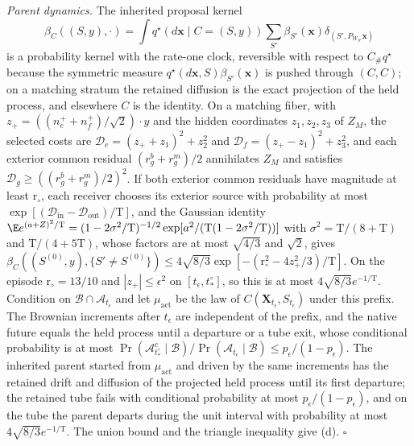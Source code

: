 \emph{Parent dynamics.} The inherited proposal kernel
\[
\beta_C((S,y),\cdot)=\int q^\star(d\mathbf x\mid C=(S,y))\sum_{S'}\beta_{S'}(\mathbf x)
\delta_{(S',P_{W_{S'}}\mathbf x)}
\]
is a probability kernel with the rate-one clock, reversible with respect to
\(C_\#q^\star\) because the symmetric measure
\(q^\star(d\mathbf x,S)\beta_{S'}(\mathbf x)\) is pushed through \((C,C)\); on a
matching stratum the retained diffusion is the exact projection of the held
process, and elsewhere \(C\) is the identity. On a matching fiber, with
\(z_+=((n^+_e+n^+_f)/\sqrt2)\cdot y\) and the hidden coordinates
\(z_1,z_2,z_3\) of \(Z_M\), the selected costs are
\(\mathcal D_e=(z_++z_1)^2+z_2^2\) and \(\mathcal D_f=(z_+-z_1)^2+z_3^2\), and each
exterior common residual \((r^b_g+r^m_g)/2\) annihilates \(Z_M\) and satisfies
\(\mathcal D_g\ge((r^b_g+r^m_g)/2)^2\). If both exterior common residuals have
magnitude at least \(\mathrm r_\circ\), each receiver chooses its exterior
source with probability at most
\(\exp[(\mathcal D_{\mathrm{in}}-\mathcal D_{\mathrm{out}})/\mathrm T]\), and the
Gaussian identity
\(\E e^{(a+Z)^2/\mathrm T}=(1-2\sigma^2/\mathrm T)^{-1/2}\exp[a^2/(\mathrm T(1-2\sigma^2/\mathrm T))]\)
with \(\sigma^2=\mathrm T/(8+\mathrm T)\) and \(\mathrm T/(4+5\mathrm T)\), whose
factors are at most \(\sqrt{4/3}\) and \(\sqrt2\), gives
\(\beta_C((S^{(0)},y),\{S'\ne S^{(0)}\})\le4\sqrt{8/3}\exp[-(\mathrm r_\circ^2-4z_+^2/3)/\mathrm T]\).
On the episode \(\mathrm r_\circ=13/10\) and \(|z_+|\le\epsilon^2\) on
\([t_\epsilon,t^\circ_*]\), so this is at most \(4\sqrt{8/3} e^{-1/\mathrm T}\).
Condition on \(\mathscr B\cap\mathscr A_{t_\epsilon}\) and let
\(\mu_{\mathrm{act}}\) be the law of \(C(\mathbf X_{t_\epsilon},S_{t_\epsilon})\)
under this prefix. The Brownian increments after \(t_\epsilon\) are independent
of the prefix, and the native future equals the held process until a
departure or a tube exit, whose conditional probability is at most
\(\Pr(\mathscr A^c_{t^\circ_*}\mid\mathscr B)/\Pr(\mathscr A_{t_\epsilon}\mid\mathscr B)
\le p_\epsilon/(1-p_\epsilon)\). The inherited parent started from
\(\mu_{\mathrm{act}}\) and driven by the same increments has the retained drift
and diffusion of the projected held process until its first departure; the
retained tube fails with conditional probability at most
\(p_\epsilon/(1-p_\epsilon)\), and on the tube the parent departs during the
unit interval with probability at most \(4\sqrt{8/3} e^{-1/\mathrm T}\). The
union bound and the triangle inequality give (d). \(\square\)

